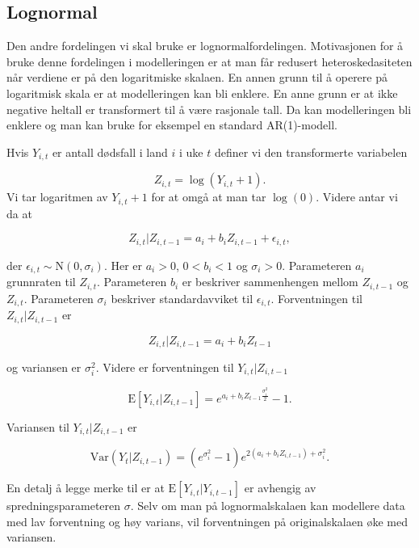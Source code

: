 \subsection{Lognormal}

Den andre fordelingen vi skal bruke er lognormalfordelingen. Motivasjonen for å
bruke denne fordelingen i modelleringen er at man får redusert
heteroskedasiteten når verdiene er på den logaritmiske skalaen. En annen grunn
til å operere på logaritmisk skala er at modelleringen kan bli enklere. En anne
grunn er at ikke negative heltall er transformert til å være rasjonale tall. Da
kan modelleringen bli enklere og man kan bruke for eksempel en standard
AR(1)-modell.

Hvis $Y_{i,t}$ er antall dødsfall i land $i$ i uke $t$ definer vi den transformerte variabelen

$$
Z_{i,t} = \log(Y_{i,t} + 1).
$$
\noindent
Vi tar logaritmen av $Y_{i,t} + 1$ for at omgå at man tar $\log(0)$. Videre antar vi da at

$$
Z_{i,t}|Z_{i,t-1} = a_i + b_iZ_{i,t-1} + \epsilon_{i,t},
$$

\noindent
der $\epsilon_{i,t} \sim \mathrm{N}(0, \sigma_i)$.  Her er $a_i > 0$, $0 < b_i
< 1$ og $\sigma_i > 0$. Parameteren $a_i$ grunnraten til $Z_{i,t}$. Parameteren
$b_i$ er beskriver sammenhengen mellom $Z_{i, t-1}$ og $Z_{i,t}$. Parameteren
$\sigma_i$ beskriver standardavviket til $\epsilon_{i, t}$. Forventningen til
$Z_{i,t}|Z_{i,t-1}$ er

$$
Z_{i,t}|Z_{i,t-1} = a_i + b_iZ_{t-1}
$$

\noindent
og variansen er $\sigma_{i}^2$. Videre er forventningen til $Y_{i,t}|Z_{i,t-1}$

$$
\mathrm{E}[Y_{i,t}|Z_{i,t-1}] = e^{a_i +b_iZ_{t-1} \frac{\sigma_i^2}{2}} - 1.
$$

Variansen til $Y_{i,t}|Z_{i,t-1}$ er

$$
\mathrm{Var}(Y_t|Z_{i,t-1}) = (e^{\sigma_i^2}-1)e^{2(a_i+b_iZ_{i,t-1}) + \sigma_i^2}.
$$

En detalj å legge merke til  er at $\mathrm{E}[Y_{i,t}|Y_{i,t-1}]$ er avhengig
av spredningsparameteren $\sigma$. Selv om man på lognormalskalaen kan
modellere data med lav forventning og høy varians, vil forventningen på
originalskalaen øke med variansen. 

